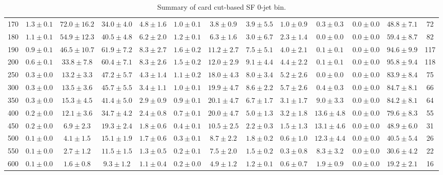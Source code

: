 \begin{table}[!htb]
{\begin{center}
\begin{tabular}{l | c c | c c c c c c c c  | c c}
170 & $1.3\pm0.1$ & $72.0\pm16.2$ & $34.0\pm4.0$ & $4.8\pm1.6$ & $1.0\pm0.1$ & $3.8\pm0.9$ & $3.9\pm5.5$ & $1.0\pm0.9$ & $0.3\pm0.3$ & $0.0\pm0.0$ & $48.8\pm7.1$ & 72 \\
180 & $1.1\pm0.1$ & $54.9\pm12.3$ & $40.5\pm4.8$ & $6.2\pm2.0$ & $1.2\pm0.1$ & $6.3\pm1.6$ & $3.0\pm6.7$ & $2.3\pm1.4$ & $0.0\pm0.0$ & $0.0\pm0.0$ & $59.4\pm8.7$ & 82 \\
190 & $0.9\pm0.1$ & $46.5\pm10.7$ & $61.9\pm7.2$ & $8.3\pm2.7$ & $1.6\pm0.2$ & $11.2\pm2.7$ & $7.5\pm5.1$ & $4.0\pm2.1$ & $0.1\pm0.1$ & $0.0\pm0.0$ & $94.6\pm9.9$ & 117 \\
200 & $0.6\pm0.1$ & $33.8\pm7.8$ & $60.4\pm7.1$ & $8.3\pm2.6$ & $1.5\pm0.2$ & $12.0\pm2.9$ & $9.1\pm4.4$ & $4.4\pm2.2$ & $0.1\pm0.1$ & $0.0\pm0.0$ & $95.8\pm9.4$ & 118 \\
250 & $0.3\pm0.0$ & $13.2\pm3.3$ & $47.2\pm5.7$ & $4.3\pm1.4$ & $1.1\pm0.2$ & $18.0\pm4.3$ & $8.0\pm3.4$ & $5.2\pm2.6$ & $0.0\pm0.0$ & $0.0\pm0.0$ & $83.9\pm8.4$ & 75 \\
300 & $0.3\pm0.0$ & $13.5\pm3.6$ & $45.7\pm5.5$ & $3.4\pm1.1$ & $1.0\pm0.1$ & $19.9\pm4.7$ & $8.6\pm2.2$ & $5.7\pm2.6$ & $0.4\pm0.3$ & $0.0\pm0.0$ & $84.7\pm8.1$ & 66 \\
350 & $0.3\pm0.0$ & $15.3\pm4.5$ & $41.4\pm5.0$ & $2.9\pm0.9$ & $0.9\pm0.1$ & $20.1\pm4.7$ & $6.7\pm1.7$ & $3.1\pm1.7$ & $9.0\pm3.3$ & $0.0\pm0.0$ & $84.2\pm8.1$ & 64 \\
400 & $0.2\pm0.0$ & $12.1\pm3.6$ & $34.7\pm4.2$ & $2.4\pm0.8$ & $0.7\pm0.1$ & $20.0\pm4.7$ & $5.0\pm1.3$ & $3.2\pm1.8$ & $13.6\pm4.8$ & $0.0\pm0.0$ & $79.6\pm8.3$ & 55 \\
450 & $0.2\pm0.0$ & $6.9\pm2.3$ & $19.3\pm2.4$ & $1.8\pm0.6$ & $0.4\pm0.1$ & $10.5\pm2.5$ & $2.2\pm0.3$ & $1.5\pm1.3$ & $13.1\pm4.6$ & $0.0\pm0.0$ & $48.9\pm6.0$ & 31 \\
500 & $0.1\pm0.0$ & $4.1\pm1.5$ & $15.1\pm1.9$ & $1.7\pm0.6$ & $0.3\pm0.1$ & $8.7\pm2.2$ & $1.8\pm0.2$ & $0.6\pm1.0$ & $12.3\pm4.4$ & $0.0\pm0.0$ & $40.5\pm5.4$ & 26 \\
550 & $0.1\pm0.0$ & $2.7\pm1.2$ & $11.5\pm1.5$ & $1.3\pm0.5$ & $0.2\pm0.1$ & $7.5\pm2.0$ & $1.5\pm0.2$ & $0.3\pm0.8$ & $8.3\pm3.2$ & $0.0\pm0.0$ & $30.6\pm4.2$ & 22 \\
600 & $0.1\pm0.0$ & $1.6\pm0.8$ & $9.3\pm1.2$ & $1.1\pm0.4$ & $0.2\pm0.0$ & $4.9\pm1.2$ & $1.2\pm0.1$ & $0.6\pm0.7$ & $1.9\pm0.9$ & $0.0\pm0.0$ & $19.2\pm2.1$ & 16 \\
 \hline
 \hline
\end{tabular}
\end{center}
}
\caption{Summary of card cut-based SF 0-jet bin.}
\end{table}
